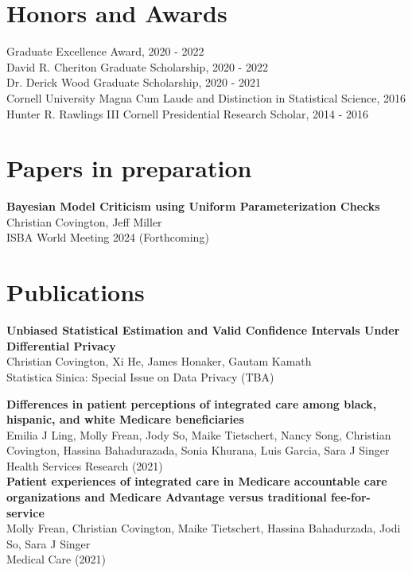 \documentclass[margin,line]{res}
\begin{document}
\begin{resume}
\section{\sc Honors and Awards} 
Graduate Excellence Award, 2020 - 2022 \\
David R. Cheriton Graduate Scholarship, 2020 - 2022 \\
Dr. Derick Wood Graduate Scholarship, 2020 - 2021 \\
Cornell University Magna Cum Laude and Distinction in Statistical Science, 2016 \\
Hunter R. Rawlings III Cornell Presidential Research Scholar, 2014 - 2016

\section{\sc Papers in preparation}

\textbf{Bayesian Model Criticism using Uniform Parameterization Checks} \\
Christian Covington, Jeff Miller \\
ISBA World Meeting 2024 (Forthcoming)

\section{\sc Publications}
\textbf{Unbiased Statistical Estimation and Valid Confidence Intervals Under Differential Privacy} \\
Christian Covington, Xi He, James Honaker, Gautam Kamath \\
Statistica Sinica: Special Issue on Data Privacy (TBA)

\textbf{Differences in patient perceptions of integrated care among black, hispanic, and white Medicare beneficiaries} \\
Emilia J Ling, Molly Frean, Jody So, Maike Tietschert, Nancy Song, Christian Covington, Hassina Bahadurazada, Sonia Khurana, Luis Garcia, Sara J Singer \\ 
Health Services Research (2021) \\

\textbf{Patient experiences of integrated care in Medicare accountable care organizations and Medicare Advantage versus traditional fee-for-service} \\
Molly Frean, Christian Covington, Maike Tietschert, Hassina Bahadurzada, Jodi So, Sara J Singer \\
Medical Care (2021) \\


\end{resume}
\end{document}
